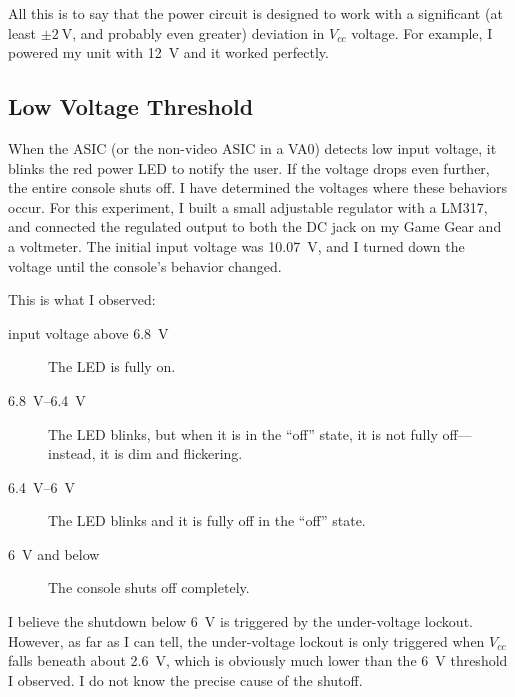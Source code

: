 \documentclass{article}
\newcommand{\Vcc}{$V_{cc}$}
\newcommand{\model}{\textsf}
\begin{document}
All this is to say that the power circuit is designed to work with a
significant (at least $\pm{}\qty{2}{\volt}$, and probably even
greater) deviation in \Vcc{} voltage. For example, I powered my unit
with \qty{12}{\volt} and it worked perfectly.

\subsection{Low Voltage Threshold}
When the ASIC (or the non-video ASIC in a \model{VA0}) detects low
input voltage, it blinks the red power LED to notify the user. If the
voltage drops even further, the entire console shuts off. I have
determined the voltages where these behaviors occur. For this
experiment, I built a small adjustable regulator with a \model{LM317},
and connected the regulated output to both the DC jack on my Game Gear
and a voltmeter. The initial input voltage was \qty{10.07}{\volt}, and
I turned down the voltage until the console's behavior changed.

This is what I observed:

\begin{description}
\item[input voltage above \qty{6.8}{\volt}] The LED is fully on.
\item[\qty{6.8}{\volt}--\qty{6.4}{\volt}] The LED blinks, but when it
  is in the ``off'' state, it is not fully off---instead, it is dim
  and flickering.
\item[\qty{6.4}{\volt}--\qty{6}{\volt}] The LED blinks and it is fully
  off in the ``off'' state.
\item[\qty{6}{\volt} and below] The console shuts off completely.
\end{description}

I believe the shutdown below \qty{6}{\volt} is triggered by the
under-voltage lockout. However, as far as I can tell, the
under-voltage lockout is only triggered when \Vcc{} falls beneath
about \qty{2.6}{\volt}, which is obviously much lower than the
\qty{6}{\volt} threshold I observed. I do not know the precise
cause of the shutoff.

\end{document}
